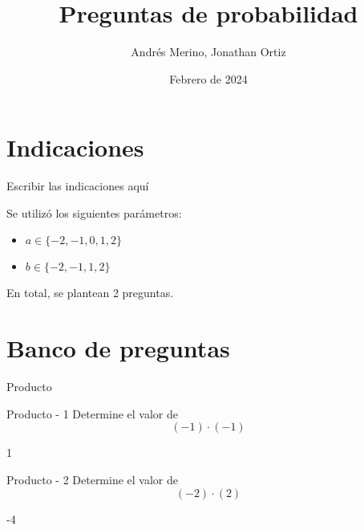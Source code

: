 \documentclass[a4,11pt]{article}
\title{Preguntas de probabilidad}
\author{Andrés Merino, Jonathan Ortiz}
\date{Febrero de 2024}
\begin{document}
\maketitle

\section{Indicaciones}

Escribir las indicaciones aquí



Se utilizó los siguientes parámetros:
\begin{itemize}
	\item $a \in \{-2, -1, 0, 1, 2\}$
	\item $b \in \{-2, -1, 1, 2\}$

\end{itemize}
En total, se plantean 2 preguntas.


\section{Banco de preguntas}

\begin{quiz}{Producto}

\begin{numerical}[]%
    {Producto - 1}
    Determine el valor de
    \[
        (-1) \cdot (-1)
    \]
    \item[] 1
\end{numerical}

\begin{numerical}[]%
    {Producto - 2}
    Determine el valor de
    \[
        (-2) \cdot (2)
    \]
    \item[] -4
\end{numerical}




\end{quiz}
\end{document}
